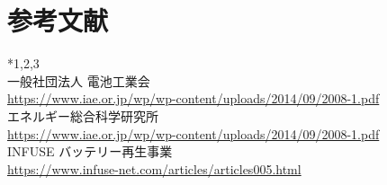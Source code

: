 \documentclass[dvipdfmx,autodetect-engine,titlepage]{jsarticle}
\begin{document}
\section{参考文献}

*1,2,3\\
一般社団法人 電池工業会\\
\url{https://www.iae.or.jp/wp/wp-content/uploads/2014/09/2008-1.pdf}\\

エネルギー総合科学研究所\\
\url{https://www.iae.or.jp/wp/wp-content/uploads/2014/09/2008-1.pdf}\\

INFUSE バッテリー再生事業\\
\url{https://www.infuse-net.com/articles/articles005.html}\\
\end{document}
